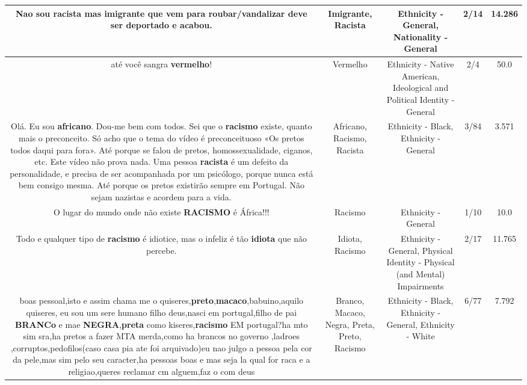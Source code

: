 \documentclass[11pt]{article}
\newlength\mylength
\begin{document}
\begin{center}
\begin{longtable}{|C{.65\mylength}|C{.30\mylength}|C{.12\mylength}|C{.12\mylength}|C{.12\mylength}|}
  \small Nao sou \textbf{racista} mas \textbf{imigrante} que vem para roubar/vandalizar deve ser deportado e acabou.\normalsize   & Imigrante, Racista & Ethnicity - General, Nationality - General & 2/14 & 14.286 \\  \hline
  \small até você sangra \textbf{v\textbf{ermelho}}!\normalsize   & Vermelho & Ethnicity - Native American, Ideological and Political Identity - General & 2/4 & 50.0 \\  \hline
  \small Olá. Eu sou \textbf{africano}. Dou-me bem  com todos. Sei que o \textbf{racismo} existe, quanto mais o preconceito. Só acho que o tema do vídeo é preconceituoso «Os pretos todos daqui para fora». Até porque se falou de pretos, homossexualidade, ciganos, etc. Este vídeo não prova nada. Uma pessoa \textbf{racista} é um defeito da personalidade, e precisa de ser acompanhada por um psicólogo, porque nunca está bem consigo mesma. Até porque os pretos existirão sempre em Portugal. Não sejam nazistas e acordem para a vida.\normalsize   & Africano, Racismo, Racista & Ethnicity - Black, Ethnicity - General & 3/84 & 3.571 \\  \hline
  \small O lugar do mundo onde não existe \textbf{RACISMO} é África!!!\normalsize   & Racismo & Ethnicity - General & 1/10 & 10.0 \\  \hline
  \small Todo e qualquer tipo de \textbf{racismo} é idiotice, mas o infeliz é tão \textbf{idiota} que não percebe.\normalsize   & Idiota, Racismo & Ethnicity - General, Physical Identity - Physical (and Mental) Impairments & 2/17 & 11.765 \\  \hline
  \small boas pessoal,isto e assim chama me o quiseres,\textbf{preto},\textbf{macaco},babuino,aquilo quiseres, eu sou um sere humano filho deus,nasci em portugal,filho de pai \textbf{BRANCo} e mae \textbf{NEGRA},\textbf{preta} como kiseres,\textbf{racismo} EM portugal?ha mto sim sra,ha pretos a fazer MTA merda,como ha brancos no governo ,ladroes ,corruptos,pedofilos(caso casa pia ate foi arquivado)eu nao julgo a pessoa pela cor da pele,mas sim pelo seu caracter,ha pessoas boas e mas seja la qual for raca e a religiao,queres reclamar cm alguem,faz o com deus\normalsize   & Branco, Macaco, Negra, Preta, Preto, Racismo & Ethnicity - Black, Ethnicity - General, Ethnicity - White & 6/77 & 7.792 \\  \hline

\end{longtable}
\end{center}
\end{document}
